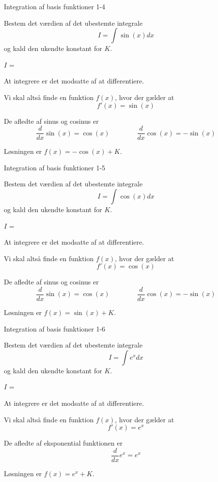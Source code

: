 \documentclass{article}
\begin{document}
\begin{exercise}{Integration af basis funktioner 1-4}

Bestem det værdien af det ubestemte integrale
\[
I = \int \sin(x) dx
\]
og kald den ukendte konstant for $K$.

$I$ =  

\hint
At integrere er det modsatte af at differentiere.

\hint
Vi skal altså finde en funktion $f(x)$, hvor der gælder at
\[
f'(x) = \sin(x)
\]

\hint
De afledte af sinus og cosinus er
\[
\frac{d}{dx} \sin(x) = \cos(x)
\qquad \qquad 
\frac{d}{dx} \cos(x) = -\sin(x)
\]


\hint
Løsningen er $f(x) = -\cos(x) + K$.

\end{exercise}


\begin{exercise}{Integration af basis funktioner 1-5}

Bestem det værdien af det ubestemte integrale
\[
I = \int \cos(x) dx
\]
og kald den ukendte konstant for $K$.

$I$ =  

\hint
At integrere er det modsatte af at differentiere.

\hint
Vi skal altså finde en funktion $f(x)$, hvor der gælder at
\[
f'(x) = \cos(x)
\]

\hint
De afledte af sinus og cosinus er
\[
\frac{d}{dx} \sin(x) = \cos(x)
\qquad \qquad 
\frac{d}{dx} \cos(x) = -\sin(x)
\]


\hint
Løsningen er $f(x) = \sin(x) + K$.

\end{exercise}


\begin{exercise}{Integration af basis funktioner 1-6}

Bestem det værdien af det ubestemte integrale
\[
I = \int e^x dx
\]
og kald den ukendte konstant for $K$.

$I$ =  

\hint
At integrere er det modsatte af at differentiere.

\hint
Vi skal altså finde en funktion $f(x)$, hvor der gælder at
\[
f'(x) = e^x
\]

\hint
De afledte af eksponential funktionen er 
\[
\frac{d}{dx} e^x = e^x
\]


\hint
Løsningen er $f(x) = e^x + K$.

\end{exercise}
\end{document}
